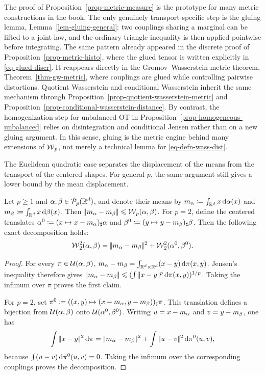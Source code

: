 \begin{rem}\label{rem-gluing-metric-engine}
	The proof of Proposition~\ref{prop-metric-measure} is the prototype for many metric constructions in the book. The only genuinely transport-specific step is the gluing lemma, Lemma~\ref{lem-gluing-general}: two couplings sharing a marginal can be lifted to a joint law, and the ordinary triangle inequality is then applied pointwise before integrating. The same pattern already appeared in the discrete proof of Proposition~\ref{prop-metric-histo}, where the glued tensor is written explicitly in \eqref{eq-glued-discr}. It reappears directly in the Gromov--Wasserstein metric theorem, Theorem~\ref{thm-gw-metric}, where couplings are glued while controlling pairwise distortions. Quotient Wasserstein and conditional Wasserstein inherit the same mechanism through Proposition~\ref{prop-quotient-wasserstein-metric} and Proposition~\ref{prop-conditional-wasserstein-distance}. By contrast, the homogenization step for unbalanced OT in Proposition~\ref{prop-homogeneous-unbalanced} relies on disintegration and conditional Jensen rather than on a new gluing argument. In this sense, gluing is the metric engine behind many extensions of \(\operatorname{\mathcal{W}}_p\), not merely a technical lemma for \eqref{eq-defn-wass-dist}.
\end{rem}

The Euclidean quadratic case separates the displacement of the means from the transport of the centered shapes. For general $p$, the same argument still gives a lower bound by the mean displacement.

\begin{prop}\label{prop-wasserstein-mean-decomposition}
	Let $p\geq1$ and $\alpha,\beta\in\mathcal{P}_p(\mathbb{R}^d)$, and denote their means by
	$m_\alpha\coloneqq\int_{\mathbb{R}^d}x\,\mathrm{d}\alpha(x)$ and
	$m_\beta\coloneqq\int_{\mathbb{R}^d}x\,\mathrm{d}\beta(x)$. Then
	$|\!| m_\alpha-m_\beta |\!|\leqslant\operatorname{\mathcal{W}}_p(\alpha,\beta)$. For $p=2$, define the centered
	translates $\alpha^0\coloneqq(x\mapsto x-m_\alpha)_\sharp\alpha$ and
	$\beta^0\coloneqq(y\mapsto y-m_\beta)_\sharp\beta$.
	Then the following exact decomposition holds:
	\[
		\operatorname{\mathcal{W}}_2^2(\alpha,\beta)
		=
		|\!| m_\alpha-m_\beta |\!|^2+\operatorname{\mathcal{W}}_2^2(\alpha^0,\beta^0).
	\]
\end{prop}
\begin{proof}
	For every $\pi\in\mathcal{U}(\alpha,\beta)$,
	$m_\alpha-m_\beta=\int_{\mathbb{R}^d\times\mathbb{R}^d}(x-y)\,\mathrm{d}\pi(x,y)$.
	Jensen's inequality therefore gives
	$|\!| m_\alpha-m_\beta |\!|\leqslant
	(\int|\!| x-y |\!|^p\,\mathrm{d}\pi(x,y))^{1/p}$.
	Taking the infimum over $\pi$ proves the first claim.

	For $p=2$, set
	$\pi^0\coloneqq((x,y)\mapsto(x-m_\alpha,y-m_\beta))_\sharp\pi$.
	This translation defines a bijection from
	$\mathcal{U}(\alpha,\beta)$ onto $\mathcal{U}(\alpha^0,\beta^0)$. Writing
	$u=x-m_\alpha$ and $v=y-m_\beta$, one has
	\[
		\int|\!| x-y |\!|^2\,\mathrm{d}\pi
		=
		|\!| m_\alpha-m_\beta |\!|^2+\int|\!| u-v |\!|^2\,\mathrm{d}\pi^0(u,v),
	\]
	because $\int(u-v)\,\mathrm{d}\pi^0(u,v)=0$. Taking the infimum over the corresponding couplings proves the decomposition.
\end{proof}

